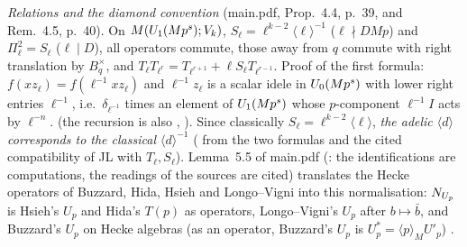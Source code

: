 \noindent\emph{Relations and the diamond convention} (main.pdf, Prop.~4.4, p.~39, and Rem.~4.5, p.~40). On
$M(U_1(Mp^s);V_k)$, $S_\ell=\ell^{k-2}\langle\ell\rangle^{-1}$ ($\ell\nmid DMp$) and $\Pi_\ell^2=S_\ell$ ($\ell\mid D$), all operators
commute, those away from $q$ commute with right translation by $B_q^\times$, and $T_\ell T_{\ell^r}=T_{\ell^{r+1}}+\ell S_\ell T_{\ell^{r-1}}$.
Proof of the first formula: $f(xz_\ell)=f(\ell^{-1}xz_\ell)$ and $\ell^{-1}z_\ell$ is a scalar idele in $U_0(Mp^s)$ with lower right entries
$\ell^{-1}$, i.e.\ $\delta_{\ell^{-1}}$ times an element of $U_1(Mp^s)$ whose $p$-component $\ell^{-1}I$ acts by $\ell^{-n}$. \stproved{}
(the recursion is also \stknown, \cite[Prop.~41.3.1, Prop.~41.3.6]{Vo}). Since classically $S_\ell=\ell^{k-2}\langle\ell\rangle$, \emph{the
adelic $\langle d\rangle$ corresponds to the classical $\langle d\rangle^{-1}$} (\stpmc{} from the two formulas and the cited compatibility of
JL with $T_\ell,S_\ell$). Lemma~5.5 of main.pdf (\stpmc: the identifications are computations, the readings of the sources are cited)
translates the Hecke operators of Buzzard, Hida, Hsieh and Longo--Vigni into this normalisation: $N_{U_p}$ is Hsieh's $U_p$ and Hida's
$T(p)$ as operators, Longo--Vigni's $U_p$ after $b\mapsto\bar b$, and Buzzard's $U_p$ on Hecke algebras (as an operator, Buzzard's $U_p$ is
$U_p^*=\langle p\rangle_MU'_p$) \cite{Buz04,Hi88b,Hs,LV}.

